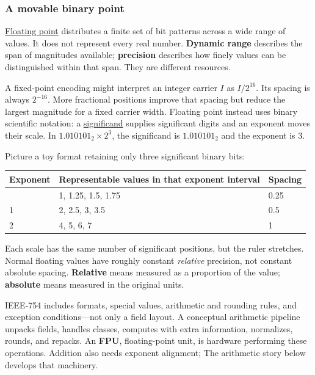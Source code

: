 \subsubsection{A movable binary point}\label{01-foundations-i-ch001-a-movable-binary-point}

\hypertarget{01-foundations-i-ch001-a-movable-binary-point}{}

\hyperref[appendix-343615f49ddf]{Floating point} distributes a finite set of bit patterns across a wide range of values. It does not represent every real number. \textbf{Dynamic range} describes the span of magnitudes available; \textbf{precision} describes how finely values can be distinguished within that span. They are different resources.

A fixed-point encoding might interpret an integer carrier \(I\) as \(I/2^{16}\). Its spacing is always \(2^{-16}\). More fractional positions improve that spacing but reduce the largest magnitude for a fixed carrier width. Floating point instead uses binary scientific notation: a \hyperref[appendix-a24fd710cf67]{significand} supplies significant digits and an exponent moves their scale. In \(1.010101_2\times2^3\), the significand is \(1.010101_2\) and the exponent is 3.

Picture a toy format retaining only three significant binary bits:

{\def\LTcaptype{none} %
\begin{longtable}[]{@{}lll@{}}
\toprule\noalign{}
Exponent & Representable values in that exponent interval & Spacing \\
\midrule\noalign{}
\endhead
\bottomrule\noalign{}
\endlastfoot
0 & 1, 1.25, 1.5, 1.75 & 0.25 \\
1 & 2, 2.5, 3, 3.5 & 0.5 \\
2 & 4, 5, 6, 7 & 1 \\
\end{longtable}
}

Each scale has the same number of significant positions, but the ruler stretches. Normal floating values have roughly constant \emph{relative} precision, not constant absolute spacing. \textbf{Relative} means measured as a proportion of the value; \textbf{absolute} means measured in the original units.

IEEE-754 includes formats, special values, arithmetic and rounding rules, and exception conditions---not only a field layout. A conceptual arithmetic pipeline unpacks fields, handles classes, computes with extra information, normalizes, rounds, and repacks. An \textbf{FPU}, floating-point unit, is hardware performing these operations. Addition also needs exponent alignment; The arithmetic story below develops that machinery.

